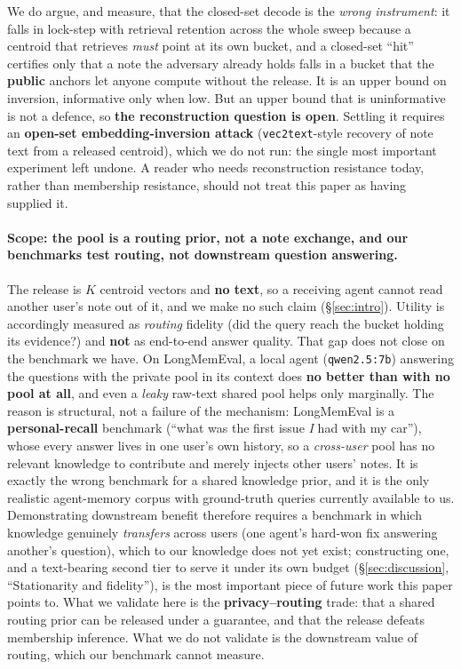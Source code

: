 \documentclass[pdflatex,sn-mathphys-num,12pt]{sn-jnl}
\theoremstyle{thmstyleone}%
\theoremstyle{thmstyletwo}%
\theoremstyle{thmstylethree}%
\newcommand{\secref}[1]{\S\ref{#1}}
\begin{document}
We do argue, and measure, that the closed-set decode is the \emph{wrong instrument}: it
falls in lock-step with retrieval retention across the whole sweep because a centroid that
retrieves \emph{must} point at its own bucket, and a closed-set ``hit'' certifies only that a
note the adversary already holds falls in a bucket that the \textbf{public} anchors let anyone
compute without the release. It is an upper bound on inversion, informative only when low. But
an upper bound that is uninformative is not a defence, so \textbf{the reconstruction question is
open}. Settling it requires an \textbf{open-set embedding-inversion attack}
(\texttt{vec2text}-style recovery of note text from a released centroid), which we do not run:
the single most important experiment left undone. A reader who needs reconstruction resistance
today, rather than membership resistance, should not treat this paper as having supplied it.

\paragraph{Scope: the pool is a routing prior, not a note exchange, and our benchmarks test
routing, not downstream question answering.} The release is $K$ centroid vectors and \textbf{no
text}, so a receiving agent cannot read another user's note out of it, and we make no such claim
(\secref{sec:intro}). Utility is accordingly measured as \emph{routing} fidelity (did the query
reach the bucket holding its evidence?) and \textbf{not} as end-to-end answer quality. That gap
does not close on the benchmark we have. On
LongMemEval, a local agent (\texttt{qwen2.5:7b}) answering the questions with the private pool in
its context does \textbf{no better than with no pool at all}, and even a \emph{leaky} raw-text
shared pool helps only marginally. The reason is structural, not a failure of the mechanism:
LongMemEval is a \textbf{personal-recall} benchmark (``what was the first issue \emph{I} had with
my car''), whose every answer lives in one user's own history, so a \emph{cross-user} pool has no
relevant knowledge to contribute and merely injects other users' notes. It is exactly the wrong
benchmark for a shared knowledge prior, and it is the only realistic agent-memory corpus with
ground-truth queries currently available to us. Demonstrating downstream benefit therefore requires
a benchmark in which knowledge genuinely \emph{transfers} across users (one agent's hard-won fix
answering another's question), which to our knowledge does not yet exist; constructing one, and a
text-bearing second tier to serve it under its own budget (\secref{sec:discussion}, ``Stationarity
and fidelity''), is the most important piece of future work this paper points to. What we validate
here is the \textbf{privacy--routing} trade: that a shared routing prior can be released under a
guarantee, and that the release defeats membership inference. What we do not validate is the
downstream value of routing, which our benchmark cannot measure.
\end{document}
